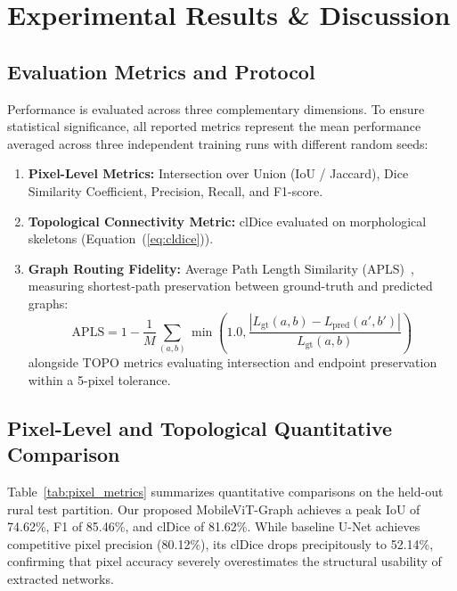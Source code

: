 \documentclass[conference]{IEEEtran}
\begin{document}
\section{Experimental Results \& Discussion}
\label{sec:experiments}

\subsection{Evaluation Metrics and Protocol}
Performance is evaluated across three complementary dimensions. To ensure statistical significance, all reported metrics represent the mean performance averaged across three independent training runs with different random seeds:
\begin{enumerate}
    \item \textbf{Pixel-Level Metrics:} Intersection over Union (IoU / Jaccard), Dice Similarity Coefficient, Precision, Recall, and F1-score.
    \item \textbf{Topological Connectivity Metric:} clDice evaluated on morphological skeletons (Equation~(\ref{eq:cldice})).
    \item \textbf{Graph Routing Fidelity:} Average Path Length Similarity (APLS)~\cite{vanetten2018spacenet}, measuring shortest-path preservation between ground-truth and predicted graphs:
    \begin{equation}
        \text{APLS} = 1 - \frac{1}{M} \sum_{(a, b)} \min\left(1.0, \frac{|L_{\text{gt}}(a, b) - L_{\text{pred}}(a', b')|}{L_{\text{gt}}(a, b)}\right)
    \end{equation}
    alongside TOPO metrics evaluating intersection and endpoint preservation within a 5-pixel tolerance.
\end{enumerate}

\subsection{Pixel-Level and Topological Quantitative Comparison}
Table~\ref{tab:pixel_metrics} summarizes quantitative comparisons on the held-out rural test partition. Our proposed MobileViT-Graph achieves a peak IoU of 74.62\%, F1 of 85.46\%, and clDice of 81.62\%. While baseline U-Net achieves competitive pixel precision (80.12\%), its clDice drops precipitously to 52.14\%, confirming that pixel accuracy severely overestimates the structural usability of extracted networks.
\end{document}
